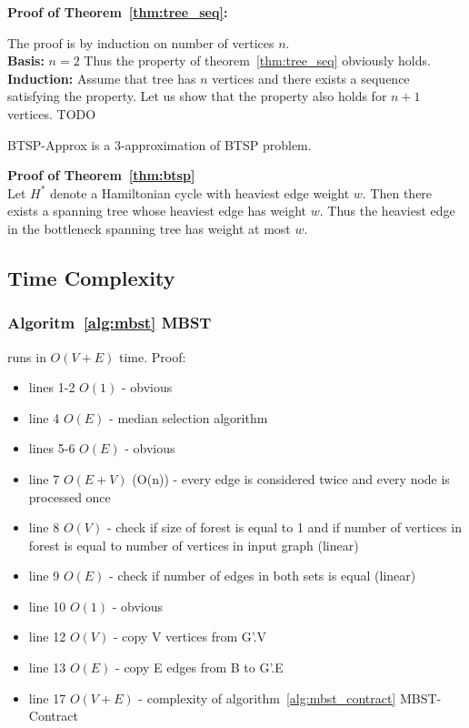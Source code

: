 \documentclass[runningheads, a4paper]{llncs}
\begin{document}
\textbf {Proof of Theorem~\ref{thm:tree_seq}:}

The proof is by induction on number of vertices $n$. \\
\textbf{Basis:} $n=2$ Thus the property of theorem~\ref{thm:tree_seq} obviously holds.\\
\textbf{Induction:} Assume that tree has $n$ vertices and there exists a sequence satisfying the property. Let us show that the property also holds for $n+1$ vertices.
TODO

\begin{theorem} \label{thm:btsp}
    BTSP-Approx is a 3-approximation of BTSP problem.
\end{theorem}

\textbf {Proof of Theorem~\ref{thm:btsp}}\\
        

        
Let $H^*$ denote a Hamiltonian cycle with heaviest edge weight $w$. Then there exists a spanning tree whose heaviest edge has weight $w$. Thus the heaviest edge in the bottleneck spanning tree has weight at most $w$.
        
        
\subsection{Time Complexity}
\subsubsection{Algoritm~\ref{alg:mbst} MBST}
runs in $O(V+E)$ time. Proof:

\begin{itemize}
  \item lines 1-2 $O(1)$ - obvious
  \item line 4 $O(E)$ - median selection algorithm \cite{cormen_9}
  \item lines 5-6 $O(E)$ - obvious
  \item line 7 $O(E+V)$ (O(n)) - every edge is considered twice and every node is processed once
  \item line 8 $O(V)$ - check if size of forest is equal to 1 and if number of vertices in forest is equal to number of vertices in input graph (linear)
  \item line 9 $O(E)$ - check if number of edges  in both sets is equal (linear)
  \item line 10 $O(1)$ - obvious
  \item line 12 $O(V)$ - copy V vertices from G'.V
  \item line 13 $O(E)$ - copy E edges from B to G'.E
  \item line 17 $O(V+E)$ - complexity of algorithm~\ref{alg:mbst_contract} MBST-Contract
\end{itemize}
\end{document}
